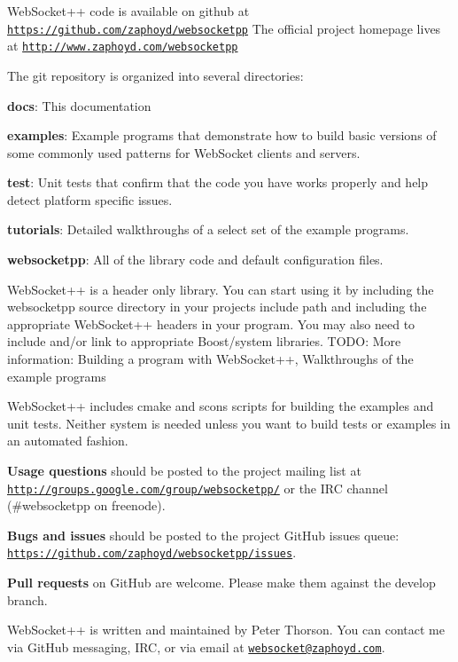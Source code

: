 Web\+Socket++ code is available on github at \href{https://github.com/zaphoyd/websocketpp}{\tt https\+://github.\+com/zaphoyd/websocketpp} The official project homepage lives at \href{http://www.zaphoyd.com/websocketpp}{\tt http\+://www.\+zaphoyd.\+com/websocketpp}

The git repository is organized into several directories\+:


\begin{DoxyItemize}
\item {\bfseries docs}\+: This documentation
\item {\bfseries examples}\+: Example programs that demonstrate how to build basic versions of some commonly used patterns for Web\+Socket clients and servers.
\item {\bfseries test}\+: Unit tests that confirm that the code you have works properly and help detect platform specific issues.
\item {\bfseries tutorials}\+: Detailed walkthroughs of a select set of the example programs.
\item {\bfseries websocketpp}\+: All of the library code and default configuration files.
\end{DoxyItemize}

Web\+Socket++ is a header only library. You can start using it by including the websocketpp source directory in your project\textquotesingle{}s include path and including the appropriate Web\+Socket++ headers in your program. You may also need to include and/or link to appropriate Boost/system libraries. T\+O\+DO\+: More information\+: Building a program with Web\+Socket++, Walkthroughs of the example programs

Web\+Socket++ includes cmake and scons scripts for building the examples and unit tests. Neither system is needed unless you want to build tests or examples in an automated fashion.

{\bfseries Usage questions} should be posted to the project mailing list at \href{http://groups.google.com/group/websocketpp/}{\tt http\+://groups.\+google.\+com/group/websocketpp/} or the I\+RC channel (\#websocketpp on freenode).

{\bfseries Bugs and issues} should be posted to the project Git\+Hub issues queue\+: \href{https://github.com/zaphoyd/websocketpp/issues}{\tt https\+://github.\+com/zaphoyd/websocketpp/issues}.

{\bfseries Pull requests} on Git\+Hub are welcome. Please make them against the {\ttfamily develop} branch.

Web\+Socket++ is written and maintained by Peter Thorson. You can contact me via Git\+Hub messaging, I\+RC, or via email at \href{mailto:websocket@zaphoyd.com}{\tt websocket@zaphoyd.\+com}. 